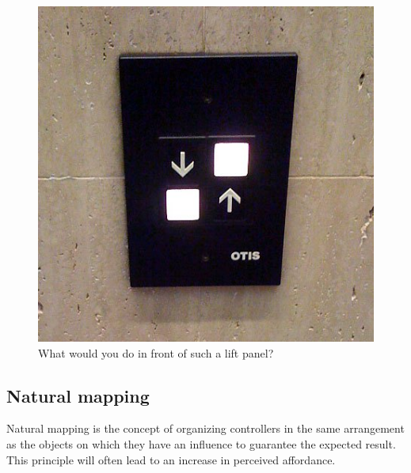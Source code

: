 \documentclass[a4paper,11pt] {article}
\theoremstyle{definition}
\begin{document}
\begin{figure}[h]
\centering
\includegraphics[scale=0.20]{fig-report/bad-switches.jpg}
\caption{What would you do in front of such a lift panel?}
\end{figure}

    \subsection{Natural mapping}
Natural mapping is the concept of organizing controllers in the same arrangement as the objects on which they have an influence to guarantee the expected result. This principle will often lead to an increase in perceived affordance.\\
\end{document}
